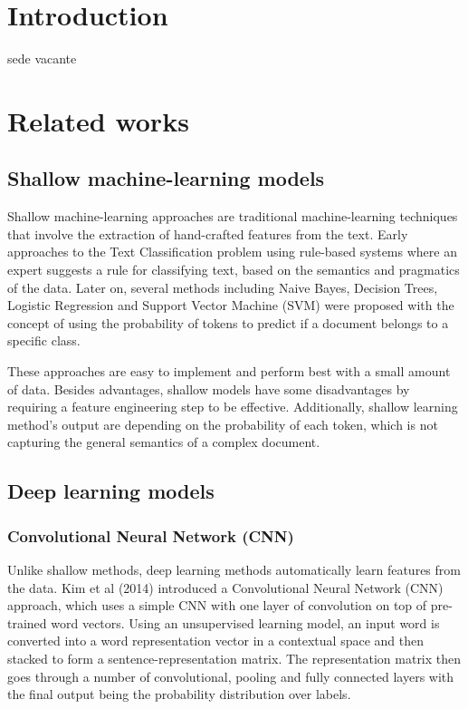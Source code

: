 \documentclass[pdflatex,sn-mathphys]{sn-jnl}%
\theoremstyle{thmstyleone}%
\theoremstyle{thmstyletwo}%
\theoremstyle{thmstylethree}%
\begin{document}
\section{Introduction}\label{introduction}
sede vacante

\section{Related works}\label{relatedworks}
\subsection{Shallow machine-learning models}

Shallow machine-learning approaches are traditional machine-learning techniques that involve the extraction of hand-crafted features from the text. Early approaches to the Text Classification problem using rule-based systems where an expert suggests a rule for classifying text, based on the semantics and pragmatics of the data. Later on, several methods including Naive Bayes\cite{Xu2017}, Decision Trees\cite{Safavian1991}, Logistic Regression\cite{Genkin2007} and Support Vector Machine (SVM)\cite{boser1992, cortesvapnik1995} were proposed with the concept of using the probability of tokens to predict if a document belongs to a specific class. 

These approaches are easy to implement and perform best with a small amount of data. Besides advantages, shallow models have some disadvantages by requiring a feature engineering step to be effective. Additionally, shallow learning method's output are depending on the probability of each token, which is not capturing the general semantics of a complex document.

\subsection{Deep learning models}
\subsubsection{Convolutional Neural Network (CNN)}
Unlike shallow methods, deep learning methods automatically learn features from the data. Kim et al (2014) introduced a Convolutional Neural Network (CNN) approach, which uses a simple CNN with one layer of convolution on top of pre-trained word vectors\cite{Kim2014}. Using an unsupervised learning model, an input word is converted into a word representation vector in a contextual space and then stacked to form a sentence-representation matrix. The representation matrix then goes through a number of convolutional, pooling and fully connected layers with the final output being the probability distribution over labels.
\end{document}
